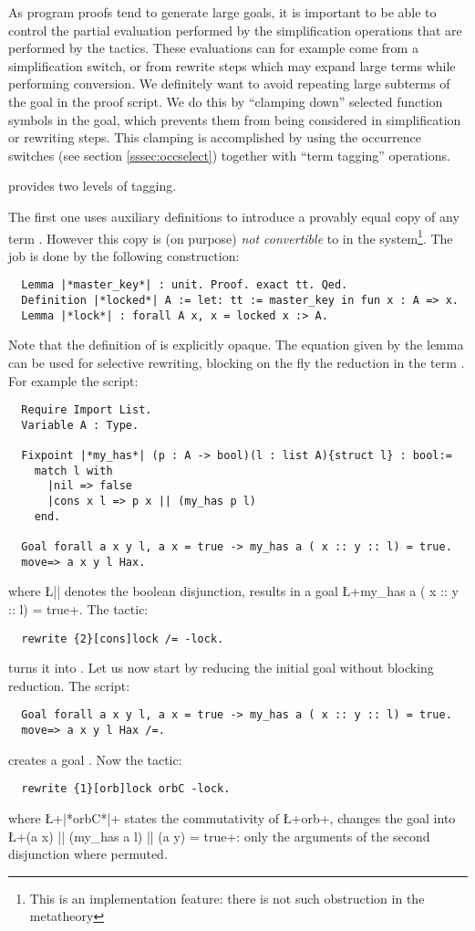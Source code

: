 As program proofs tend to generate large goals, it is important to be
able to control the partial evaluation performed by the simplification
operations that are performed by the tactics. These evaluations can
for example come from a \C{/=} simplification switch, or from rewrite steps
which may expand large terms while performing conversion. We definitely
want to avoid repeating large subterms of the goal in
the proof script. We do this by
``clamping down'' selected function symbols in the goal, which
prevents them from
being considered in simplification or rewriting steps. This clamping
is accomplished by using the occurrence switches (see section
\ref{sssec:occselect}) together with ``term tagging'' operations.

\ssr{} provides two levels of tagging.

The first one uses auxiliary definitions to introduce a provably equal
copy of any term . However this copy is (on purpose)
\emph{not convertible} to  in the \Coq{} system\footnote{This is
  an implementation feature: there is not such obstruction in the
  metatheory}. The job is done by the following construction:

\begin{lstlisting}
  Lemma |*master_key*| : unit. Proof. exact tt. Qed.
  Definition |*locked*| A := let: tt := master_key in fun x : A => x.
  Lemma |*lock*| : forall A x, x = locked x :> A.
\end{lstlisting}
Note that the definition of  is explicitly opaque.
The equation  given by the  lemma can be used
for selective rewriting, blocking on the fly the reduction in the
term .
For example the script:
\begin{lstlisting}
  Require Import List.
  Variable A : Type.

  Fixpoint |*my_has*| (p : A -> bool)(l : list A){struct l} : bool:=
    match l with
      |nil => false
      |cons x l => p x || (my_has p l)
    end.

  Goal forall a x y l, a x = true -> my_has a ( x :: y :: l) = true.
  move=> a x y l Hax.
\end{lstlisting}
where \L{||} denotes the boolean disjunction, results in a goal
\L+my_has a ( x :: y :: l) = true+. The tactic:
\begin{lstlisting}
  rewrite {2}[cons]lock /= -lock.
\end{lstlisting}
turns it into .
Let us now start by reducing the initial goal without blocking reduction.
The script:
\begin{lstlisting}
  Goal forall a x y l, a x = true -> my_has a ( x :: y :: l) = true.
  move=> a x y l Hax /=.
\end{lstlisting}
creates a goal . Now the
tactic:
\begin{lstlisting}
  rewrite {1}[orb]lock orbC -lock.
\end{lstlisting}
where \L+|*orbC*|+ states the commutativity of \L+orb+, changes the
goal into\\ \L+(a x) || (my_has a l) || (a y) = true+: only the
arguments of the second disjunction where permuted.


